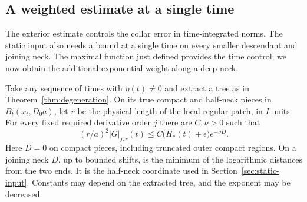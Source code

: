 \subsection{A weighted estimate at a single time}
\label{para:interior-subsection}

The exterior estimate controls the collar error in time-integrated
norms. The static input also needs a bound at a single time on every
smaller descendant and joining neck. The maximal function just defined
provides the time control; we now obtain the additional exponential
weight along a deep neck.
\begin{proposition}
\label{prop:interior-ricci}
Take any sequence of times with $\eta(t)\ne0$ and extract a tree as in
Theorem~\ref{thm:degeneration}.  On its true compact and half-neck
pieces in $B_t(x_t,D_0a)$, let $r$ be the physical length of the local
regular patch, in $I$-units.  For every fixed required derivative order
$j$ there are $C,\nu>0$ such that
\begin{equation}
 (r/a)^2|G|_{j,r}(t)
       \le C\bigl(H_*(t)+\epsilon\bigr)e^{-\nu D}.
 \label{eq:interior-weighted}
\end{equation}
Here $D=0$ on compact pieces, including truncated outer compact
regions.  On a joining neck $D$, up to bounded shifts, is the minimum
of the logarithmic distances from the two ends.  It is the half-neck
coordinate used in Section~\ref{sec:static-input}.  Constants may depend
on the extracted tree, and the exponent may be decreased.
\end{proposition}

